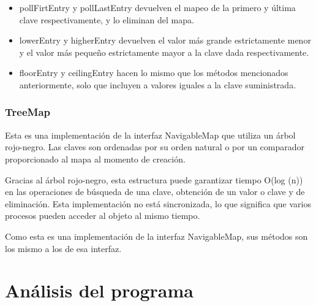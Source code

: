 \documentclass[11pt]{article}
\begin{document}
\begin{itemize}



\item pollFirtEntry y pollLastEntry devuelven el mapeo de la primero 
y última clave respectivamente, y lo eliminan del mapa.

\item lowerEntry y higherEntry devuelven el valor más grande 
estrictamente menor y el valor más pequeño estrictamente mayor a la 
clave dada respectivamente.

\item floorEntry y ceilingEntry hacen lo mismo que los métodos 
mencionados anteriormente, solo que incluyen a valores iguales a la 
clave suministrada.



\end{itemize}



\subsubsection{TreeMap}

\par

Esta es una implementación de la interfaz NavigableMap que utiliza un 
árbol rojo-negro. Las claves son ordenadas por su orden natural o por 
un comparador proporcionado al mapa al momento de creación.

\par

Gracias al árbol rojo-negro, esta estructura puede garantizar tiempo 
O(log (n)) en las operaciones de búsqueda de una clave, obtención de 
un valor o clave y de eliminación. Esta implementación no está 
sincronizada, lo que significa que varios procesos pueden acceder al 
objeto al mismo tiempo.

\par

Como esta es una implementación de la interfaz NavigableMap, sus 
métodos son los mismo a los de esa interfaz.


\section{Análisis del programa}
\end{document}
